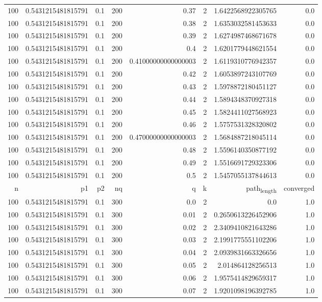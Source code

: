\documentclass[11pt]{article}
\begin{document}
\begin{center}
\begin{tabular}{rrrrrrrr}
100 & 0.5431215481815791 & 0.1 & 200 & 0.37 & 2 & 1.6422568922305765 & 0.0\\
100 & 0.5431215481815791 & 0.1 & 200 & 0.38 & 2 & 1.6353032581453633 & 0.0\\
100 & 0.5431215481815791 & 0.1 & 200 & 0.39 & 2 & 1.6274987468671678 & 0.0\\
100 & 0.5431215481815791 & 0.1 & 200 & 0.4 & 2 & 1.6201779448621554 & 0.0\\
100 & 0.5431215481815791 & 0.1 & 200 & 0.41000000000000003 & 2 & 1.6119310776942357 & 0.0\\
100 & 0.5431215481815791 & 0.1 & 200 & 0.42 & 2 & 1.6053897243107769 & 0.0\\
100 & 0.5431215481815791 & 0.1 & 200 & 0.43 & 2 & 1.5978872180451127 & 0.0\\
100 & 0.5431215481815791 & 0.1 & 200 & 0.44 & 2 & 1.5894348370927318 & 0.0\\
100 & 0.5431215481815791 & 0.1 & 200 & 0.45 & 2 & 1.5824411027568923 & 0.0\\
100 & 0.5431215481815791 & 0.1 & 200 & 0.46 & 2 & 1.5757531328320802 & 0.0\\
100 & 0.5431215481815791 & 0.1 & 200 & 0.47000000000000003 & 2 & 1.5684887218045114 & 0.0\\
100 & 0.5431215481815791 & 0.1 & 200 & 0.48 & 2 & 1.5596140350877192 & 0.0\\
100 & 0.5431215481815791 & 0.1 & 200 & 0.49 & 2 & 1.5516691729323306 & 0.0\\
100 & 0.5431215481815791 & 0.1 & 200 & 0.5 & 2 & 1.5457055137844613 & 0.0\\
\hline
n & p1 & p2 & nq & q & k & path\textsubscript{length} & converged\\
100 & 0.5431215481815791 & 0.1 & 300 & 0.0 & 2 & 0.0 & 1.0\\
100 & 0.5431215481815791 & 0.1 & 300 & 0.01 & 2 & 0.2650613226452906 & 1.0\\
100 & 0.5431215481815791 & 0.1 & 300 & 0.02 & 2 & 2.3409410821643286 & 1.0\\
100 & 0.5431215481815791 & 0.1 & 300 & 0.03 & 2 & 2.1991775551102206 & 1.0\\
100 & 0.5431215481815791 & 0.1 & 300 & 0.04 & 2 & 2.0939831663326656 & 1.0\\
100 & 0.5431215481815791 & 0.1 & 300 & 0.05 & 2 & 2.014864128256513 & 1.0\\
100 & 0.5431215481815791 & 0.1 & 300 & 0.06 & 2 & 1.9575414829659317 & 1.0\\
100 & 0.5431215481815791 & 0.1 & 300 & 0.07 & 2 & 1.9201098196392785 & 1.0\\

\end{tabular}
\end{center}
\end{document}
